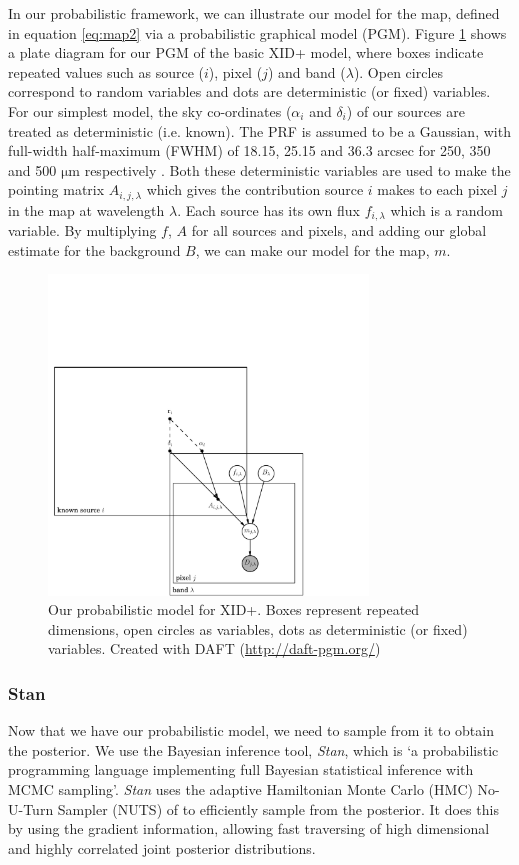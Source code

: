 \documentclass[useAMS,usenatbib]{mnras}
\begin{document}
In our probabilistic framework, we can illustrate our model for the map, defined in equation \ref{eq:map2} via a probabilistic graphical model (PGM). Figure \ref{fig:graph_mod_xid+} shows a plate diagram \citep{Bishop:2006} for our PGM of the basic XID+ model, where boxes  indicate repeated values such as source ($i$), pixel ($j$) and band ($\lambda$). Open circles correspond to random variables and dots are deterministic (or fixed) variables. For our simplest model, the sky co-ordinates ($\alpha_i$ and $\delta_i$) of our sources are treated as deterministic (i.e. known). The PRF is assumed to be a Gaussian, with full-width half-maximum (FWHM) of 18.15, 25.15 and 36.3 arcsec for 250, 350 and 500 $\mathrm{\mu m}$ respectively \citep{Griffin:2010}. Both these deterministic variables are used to make the pointing matrix $A_{i,j,\lambda}$ which gives the contribution source $i$ makes to each pixel $j$ in the map at wavelength $\lambda$. Each source has its own flux $f_{i,\lambda}$ which is a random variable. By multiplying $f$, $A$ for all sources and pixels, and adding our global estimate for the background $B$, we can make our model for the map, $m$. 
\begin{figure}
\includegraphics[width=8.5cm]{./graphical_model.pdf}
\caption{Our probabilistic model for XID+. Boxes represent repeated dimensions, open circles as variables, dots as deterministic (or fixed) variables. Created with DAFT (\url{http://daft-pgm.org/})}\label{fig:graph_mod_xid+}
\end{figure}
 
\subsubsection{Stan}
Now that we have our probabilistic model, we need to sample from it to obtain the posterior. We use the Bayesian inference tool, \textit{Stan}, which is `a probabilistic programming language implementing full Bayesian statistical inference with MCMC sampling'. \textit{Stan} uses the adaptive Hamiltonian Monte Carlo (HMC) No-U-Turn Sampler (NUTS) of \cite{Hoffman:2013} to efficiently sample from the posterior. It does this by using the gradient information, allowing fast traversing of high dimensional and highly correlated joint posterior distributions. 
\end{document}
